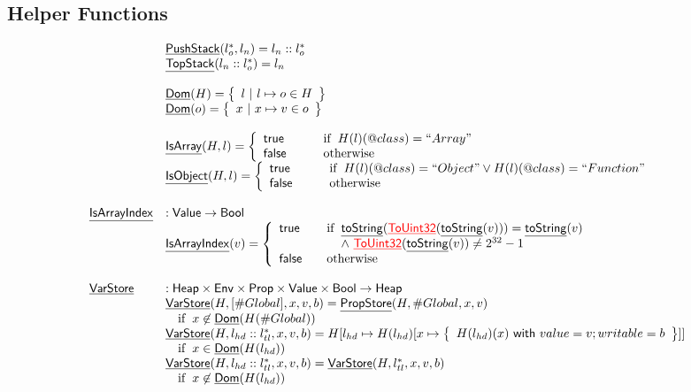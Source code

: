 \documentclass{article}
\makeatletter
\newcommand{\SF}[1]{\mbox{\textsf{#1}}}
\newcommand{\ifc}[1]{{\rm if}\begin{array}[t]{l}#1\end{array}}
\newcommand{\owc}{{\rm otherwise}}
\newcommand{\Heap}{\SF{Heap}}
\newcommand{\Prop}{\SF{Prop}}
\newcommand{\Value}{\SF{Value}}
\newcommand{\set}[1]{\left\{\begin{array}{l}#1\end{array}\right\}}
\newcommand{\hf}[1]{\underline{\sf #1}}
\newcommand{\varloc}[1]{\##1}
\newcommand{\varprop}[1]{@#1}
\newcommand{\vtrue}{\SF{true}}
\newcommand{\vfalse}{\SF{false}}
\newcommand{\rwith}{~{\sf with}~}
\def\inred{\color{red}}
\makeatother
\begin{document}
\subsection{Helper Functions}
\[
\begin{array}{ll}
& \hf{PushStack}(l_o^*,l_n) = l_n::l_o^* \\
& \hf{TopStack}(l_n::l_o^*) = l_n \\\\
& \hf{Dom}(H) = \set{l\ |\ l\mapsto o \in H} \\
& \hf{Dom}(o) = \set{x\ |\ x\mapsto v \in o} \\
\\
& \hf{IsArray}(H,l) = \left\{
  \begin{array}{l@{\quad\quad\quad}l}
    \vtrue &\ifc{H(l)(\varprop{class}) =
  ``Array"}\\
    \vfalse &\owc\\
  \end{array}\right.
\\
& \hf{IsObject}(H,l) = \left\{
  \begin{array}{l@{\quad\quad\quad}l}
    \vtrue &\ifc{H(l)(\varprop{class}) =
  ``Object"\lor H(l)(\varprop{class}) = ``Function"}\\
    \vfalse &\owc\\
  \end{array}\right.
\\\\
\hf{IsArrayIndex} & : \Value \rightarrow \SF{Bool} \\
& \hf{IsArrayIndex}(v)
  = 
  \left\{
    \begin{array}{l@{\quad\quad}l}
      \vtrue & \ifc{\hf{toString}(\hf{\inred ToUint32}(\hf{toString}(v))) = \hf{toString}(v)\\
        \land\ \hf{\inred ToUint32}(\hf{toString}(v)) \neq 2^{32}-1} \\
      \vfalse & \owc\\
    \end{array}
  \right.
\\
\\

\hf{VarStore} & : \Heap \times \SF{Env} \times \Prop \times \Value
\times \SF{Bool} \rightarrow \Heap \\
& \hf{VarStore}(H,[\varloc{Global}], x, v, b)
  =  \hf{PropStore}(H,\varloc{Global},x,v) \\
& \quad\ifc{x\not\in\hf{Dom}(H(\varloc{Global}))} \\
& \hf{VarStore}(H,l_{hd}::l_{tl}^{*},x,v,b)
  =  H[l_{hd}\mapsto H(l_{hd})[x\mapsto \set{H(l_{hd})(x) \rwith value=v; writable=b}]]\\
& \quad\ifc{x \in \hf{Dom}(H(l_{hd}))}\\
& \hf{VarStore}(H,l_{hd}::l_{tl}^{*},x,v,b)
  =  \hf{VarStore}(H,l_{tl}^{*},x,v,b)\\
& \quad\ifc{x \not\in \hf{Dom}(H(l_{hd}))}\\\\


\end{array}\]
\end{document}
